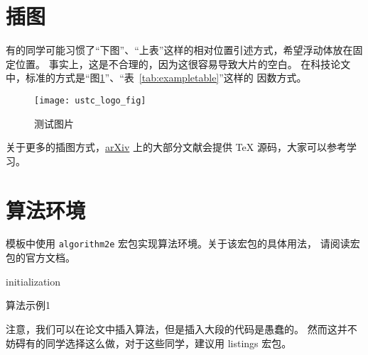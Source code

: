\section{插图}

有的同学可能习惯了“下图”、“上表”这样的相对位置引述方式，希望浮动体放在固定位置。
事实上，这是不合理的，因为这很容易导致大片的空白。
在科技论文中，标准的方式是“图\ref{fig:logo}”、“表~\ref{tab:exampletable}”这样的
因数方式。
\begin{figure}[htbp]
  \centering
  \texttt{[image: ustc\_logo\_fig]}
  \caption{测试图片}
  \label{fig:logo}
\end{figure}

关于更多的插图方式，\href{https://arxiv.org}{arXiv} 上的大部分文献会提供 \TeX{}
源码，大家可以参考学习。



\section{算法环境}

模板中使用 \texttt{algorithm2e} 宏包实现算法环境。关于该宏包的具体用法，
请阅读宏包的官方文档。

\begin{algorithm}[htbp]
  \small
  \SetAlgoLined

  initialization\;
  \caption{算法示例1}
  \label{algo:algorithm1}
\end{algorithm}

注意，我们可以在论文中插入算法，但是插入大段的代码是愚蠢的。
然而这并不妨碍有的同学选择这么做，对于这些同学，建议用 \textsf{listings} 宏包。
